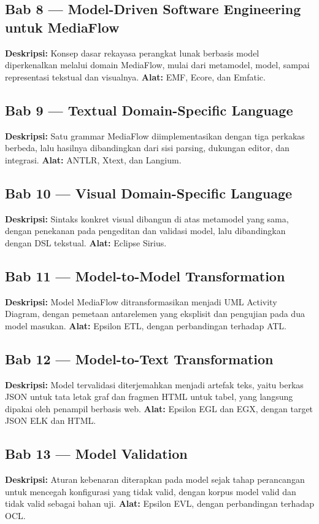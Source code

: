 \subsection*{Bab 8 --- Model-Driven Software Engineering untuk MediaFlow}
\textbf{Deskripsi:} Konsep dasar rekayasa perangkat lunak berbasis model diperkenalkan melalui domain MediaFlow, mulai dari metamodel, model, sampai representasi tekstual dan visualnya.
\textbf{Alat:} EMF, Ecore, dan Emfatic.

\subsection*{Bab 9 --- Textual Domain-Specific Language}
\textbf{Deskripsi:} Satu grammar MediaFlow diimplementasikan dengan tiga perkakas berbeda, lalu hasilnya dibandingkan dari sisi parsing, dukungan editor, dan integrasi.
\textbf{Alat:} ANTLR, Xtext, dan Langium.

\subsection*{Bab 10 --- Visual Domain-Specific Language}
\textbf{Deskripsi:} Sintaks konkret visual dibangun di atas metamodel yang sama, dengan penekanan pada pengeditan dan validasi model, lalu dibandingkan dengan DSL tekstual.
\textbf{Alat:} Eclipse Sirius.

\subsection*{Bab 11 --- Model-to-Model Transformation}
\textbf{Deskripsi:} Model MediaFlow ditransformasikan menjadi UML Activity Diagram, dengan pemetaan antarelemen yang eksplisit dan pengujian pada dua model masukan.
\textbf{Alat:} Epsilon ETL, dengan perbandingan terhadap ATL.

\subsection*{Bab 12 --- Model-to-Text Transformation}
\textbf{Deskripsi:} Model tervalidasi diterjemahkan menjadi artefak teks, yaitu berkas JSON untuk tata letak graf dan fragmen HTML untuk tabel, yang langsung dipakai oleh penampil berbasis web.
\textbf{Alat:} Epsilon EGL dan EGX, dengan target JSON ELK dan HTML.

\subsection*{Bab 13 --- Model Validation}
\textbf{Deskripsi:} Aturan kebenaran diterapkan pada model sejak tahap perancangan untuk mencegah konfigurasi yang tidak valid, dengan korpus model valid dan tidak valid sebagai bahan uji.
\textbf{Alat:} Epsilon EVL, dengan perbandingan terhadap OCL.

